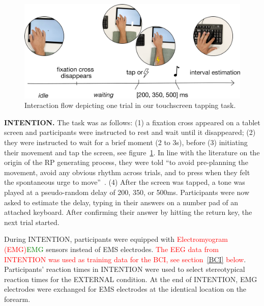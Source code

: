 \begin{figure}
    \centering
    \includegraphics[width=\columnwidth]{figures/task_new.pdf}
    \caption{Interaction flow depicting one trial in our touchscreen tapping task.}
    \label{fig:progression}
\end{figure}

\indent\textbf{INTENTION.} The task was as follows: (1) a fixation cross appeared on a tablet screen and participants were instructed to rest and wait until it disappeared; (2) they were instructed to wait for a brief moment (2 to 3s), before (3) initiating their movement and tap the screen, see figure~\ref{fig:progression}. In line with the literature on the origin of the RP generating process, they were told ``to avoid pre-planning the movement, avoid any obvious rhythm across trials, and to press when they felt the spontaneous urge to move''~\cite{Schultze-Kraft2021-cu}. (4) After the screen was tapped, a tone was played at a pseudo-random delay of 200, 350, or 500ms. Participants were now asked to estimate the delay, typing in their answers on a number pad of an attached keyboard. After confirming their answer by hitting the return key, the next trial started.

During INTENTION, participants were equipped with \textcolor{red}{Electromyogram (EMG)}\textcolor{green}{EMG} sensors instead of EMS electrodes. \textcolor{red}{The EEG data from INTENTION was used as training data for the BCI, see section~\ref{BCI} below}. Participants' reaction times in INTENTION were used to select stereotypical reaction times for the EXTERNAL condition. At the end of INTENTION, EMG electrodes were exchanged for EMS electrodes at the identical location on the forearm.


